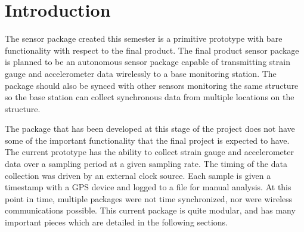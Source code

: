 \section{Introduction}
The sensor package created this semester is a primitive prototype with bare functionality with respect to the final product. The final product sensor package is planned to be an autonomous sensor package capable of transmitting strain gauge and accelerometer data wirelessly to a base monitoring station. The package  should also be synced with other sensors monitoring the same structure so the base station can collect synchronous data from multiple locations on the structure. 

The package that has been developed at this stage of the project does not have some of the important functionality that the final project is expected to have. The current prototype has the ability to collect strain gauge and accelerometer data over a sampling period at a given sampling rate. The timing of the data collection was driven by an external clock source. Each sample is given a timestamp with a GPS device and logged to a file for manual analysis. At this point in time, multiple packages were not time synchronized, nor were wireless communications possible. This current package is quite modular, and has many important pieces which are detailed in the following sections.